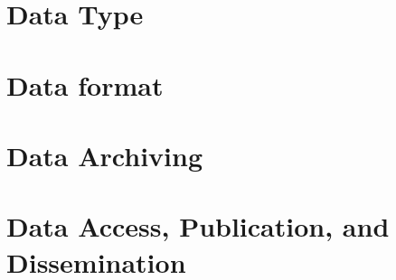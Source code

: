 \documentclass[fontsize=10pt,paper=letter,twoside=false,onecolumn]{scrartcl} %
\begin{document}
\section*{Data Type}

\section*{Data format} 

\section*{Data Archiving}

\section*{Data Access, Publication, and Dissemination}
\end{document}
